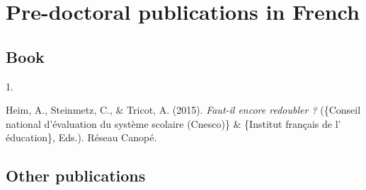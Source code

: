 \documentclass[11pt,a4paper,]{awesome-cv}
\newlength{\cslhangindent}
\newlength{\csllabelwidth}
\newenvironment{CSLReferences}[2] %
 {\begin{list}{}{%
  \setlength{\itemindent}{0pt}
  \setlength{\leftmargin}{0pt}
  \setlength{\parsep}{0pt}
  \ifodd #1
   \setlength{\leftmargin}{\cslhangindent}
   \setlength{\itemindent}{-1\cslhangindent}
  \fi
  \setlength{\itemsep}{#2\baselineskip}}}
 {\end{list}}
\newcommand{\CSLLeftMargin}[1]{\parbox[t]{\csllabelwidth}{\strut#1\strut}}
\newcommand{\CSLRightInline}[1]{\parbox[t]{\linewidth - \csllabelwidth}{\strut#1\strut}}
\begin{document}
\newpage

\section{Pre-doctoral publications in
French}\label{pre-doctoral-publications-in-french}

\subsection{Book}\label{book}

\label{refs-f1bd954e3b6663a8354a89ea926ba0ed}
\begin{CSLReferences}{0}{0}
\CSLLeftMargin{1. }%
\CSLRightInline{Heim, A., Steinmetz, C., \& Tricot, A. (2015).
\emph{Faut-il encore redoubler ?} (\{Conseil national d'évaluation du
système scolaire (Cnesco)\} \& \{Institut français de l' éducation\},
Eds.). Réseau Canopé.}

\end{CSLReferences}

\subsection{Other publications}\label{other-publications}
\end{document}
